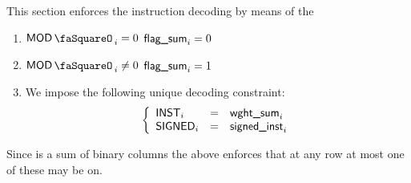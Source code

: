This section enforces the instruction decoding by means of the 
\begin{enumerate}
	\item \If $\modStamp_{i} =    0$ \Then $\textsf{flag\_sum}_{i} = 0$
	\item \If $\modStamp_{i} \neq 0$ \Then $\textsf{flag\_sum}_{i} = 1$
	\item We impose the following unique decoding constraint:
		\[
			\left\{ \begin{array}{lcl}
				\textsf{INST}_{i}        & = & \textsf{wght\_sum}_{i} \\
				\textsf{SIGNED}_{i}  & = & \textsf{signed\_inst}_{i}   \\
			\end{array} \right.
		\]
\end{enumerate}
\saNote{} Since \locFlagSum{} is a sum of binary columns the above enforces that at any row at most one of these may be on. 

